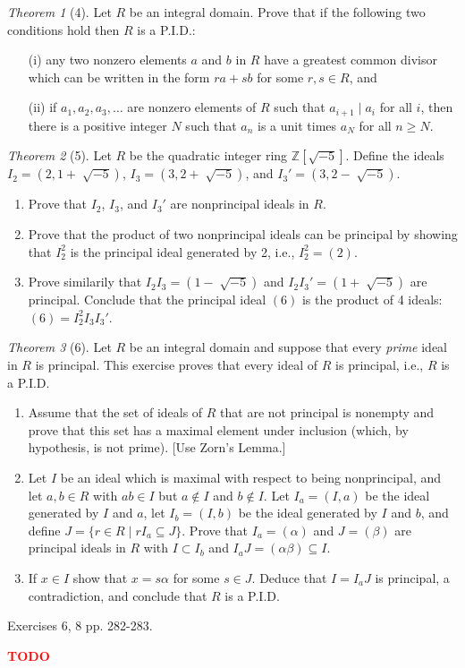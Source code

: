 \documentclass[12pt]{article}
\theoremstyle{remark}
\theoremstyle{named}
\newtheorem*{theorem}{Theorem}
\newcommand{\todo}{\textcolor{red}{\textbf{TODO} }}
\renewcommand{\a}{\alpha}
\renewcommand{\b}{\beta}
\newcommand{\Z}{\mathbb Z}
\begin{document}
\begin{theorem}[4]
    Let \(R\) be an integral domain. Prove that if the following two conditions hold then \(R\) is a P.I.D.:
    \begin{enumerate}
        \item [(i)] any two nonzero elements \(a\) and \(b\) in \(R\) have a greatest common divisor which can be written in the form \(ra + sb\) for some \(r, s \in R\), and
        \item [(ii)] if \(a_1, a_2, a_3, \dots\) are nonzero elements of \(R\) such that \(a_{i + 1} \mid a_i\) for all \(i\), then there is a positive integer \(N\) such that \(a_n\) is a unit times \(a_N\) for all \(n \ge N\). 
    \end{enumerate}
\end{theorem}

\begin{theorem}[5]
    Let \(R\) be the quadratic integer ring \(\Z[\sqrt{-5}]\). Define the ideals \(I_2 = (2, 1 + \sqrt[]{-5})\), \(I_3 = (3, 2 + \sqrt[]{-5})\), and \(I_3' = (3, 2 - \sqrt[]{-5})\).
    \begin{enumerate}
        \item Prove that \(I_2\), \(I_3\), and \(I_3'\) are nonprincipal ideals in \(R\).
        \item Prove that the product of two nonprincipal ideals can be principal by showing that \(I_2^2\) is the principal ideal generated by 2, i.e., \(I_2^2 = (2)\).
        \item Prove similarily that \(I_2 I_3 = (1 - \sqrt[]{-5})\) and \(I_2 I_3' = (1 + \sqrt[]{-5})\) are principal. Conclude that the principal ideal \((6)\) is the product of 4 ideals: \((6) = I_2^2 I_3 I_3'\).
    \end{enumerate}
\end{theorem}

\begin{theorem}[6]
    Let \(R\) be an integral domain and suppose that every \textit{prime} ideal in \(R\) is principal. This exercise proves that every ideal of \(R\) is principal, i.e., \(R\) is a P.I.D.
    \begin{enumerate}
        \item Assume that the set of ideals of \(R\) that are not principal is nonempty and prove that this set has a maximal element under inclusion (which, by hypothesis, is not prime). [Use Zorn's Lemma.]
        \item Let \(I\) be an ideal which is maximal with respect to being nonprincipal, and let \(a, b\in R\) with \(ab \in I\) but \(a \notin I\) and \(b \notin I\). Let \(I_a = (I, a)\) be the ideal generated by \(I\) and \(a\), let \(I_b = (I, b)\) be the ideal generated by \(I\) and \(b\), and define \(J = \{r \in R \mid rI_a \subseteq J\}\). Prove that \(I_a = (\a)\) and \(J = (\b)\) are principal ideals in \(R\) with \(I \subset I_b\) and \(I_a J = (\a \b) \subseteq I\).
        \item If \(x \in I\) show that \(x = s \a\) for some \(s \in J\). Deduce that \(I = I_a J\) is principal, a contradiction, and conclude that \(R\) is a P.I.D.
    \end{enumerate}
\end{theorem}

Exercises 6, 8 pp. 282-283.

\todo
\end{document}
